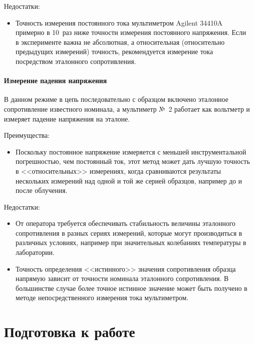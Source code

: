 \documentclass[12pt, a4paper, twocolumn]{book}
\begin{document}
Недостатки:

\begin{itemize}
\item Точность измерения постоянного тока мультиметром Agilent 34410A примерно в 10~раз ниже точности измерения постоянного напряжения. Если в эксперименте важна не абсолютная, а относительная (относительно предыдущих измерений) точность, рекомендуется измерение тока посредством эталонного сопротивления.
\end{itemize}

\subsubsection{Измерение падения напряжения}
\label{sec_test_measure}

В данном режиме в цепь последовательно с образцом включено эталонное сопротивление известного номинала, а мультиметр №~2 работает как вольтметр и измеряет падение напряжения на эталоне.

Преимущества:

\begin{itemize}
\item Поскольку постоянное напряжение измеряется с меньшей инструментальной погрешностью, чем постоянный ток, этот метод может дать лучшую точность в <<относительных>> измерениях, когда сравниваются результаты нескольких измерений над одной и той же серией образцов, например до и после облучения.
\end{itemize}

Недостатки:

\begin{itemize}
\item От оператора требуется обеспечивать стабильность величины эталонного сопротивления в разных сериях измерений, которые могут производиться в различных условиях, например при значительных колебаниях температуры в лаборатории.
\item Точность определения <<истинного>> значения сопротивления образца напрямую зависит от точности номинала эталонного сопротивления. В большинстве случае более точное истинное значение может быть получено в методе непосредственного измерения тока мультиметром.
\end{itemize}

\chapter{Подготовка к работе}
\end{document}
